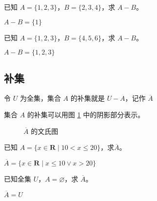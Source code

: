 \documentclass[lang=cn, chinesefont=founder, color=cyan, citestyle=gb7714-2015, bibstyle=gb7714-2015]{elegantbook}
\newcommand{\spare}{\vspace{-1em}\begin{center}\color{structurecolor}\hdashrule[0.5ex]{\textwidth}{1pt}{1pt}\end{center}\vspace{-1em}}
\renewcommand{\bar}[1]{\overline{#1}}
\begin{document}
\begin{collections}
    \begin{example}
        已知 $A = \{ 1, 2, 3 \}$，$B = \{2, 3, 4\}$，求 $A - B$。
    \end{example}
    \begin{solution}
        $A-B = \{1\}$
    \end{solution}

    \spare

    \begin{example}
        已知 $A = \{1, 2, 3\}$，$B = \{4, 5, 6\}$，求 $A - B$。
    \end{example}
    \begin{solution}
        $A - B = \{1, 2, 3\}$
    \end{solution}
\end{collections}

\subsection{补集}
\begin{definition}[集合的补集]
    令 $U$ 为全集，集合 $A$ 的补集就是 $U-A$，记作 $\bar{A}$
\end{definition}

集合 $A$ 的补集可以用图 \ref{fig:补集文氏图} 中的阴影部分表示。
\begin{figure}[htbp!]
    \centering
    \caption{$\bar{A}$ 的文氏图}
    \label{fig:补集文氏图}
\end{figure}

\begin{collections}
    \begin{example}
        已知 $A = \{x \in \symbf{R} \mid 10 < x \leq 20\}$，求$\bar{A}$。
    \end{example}
    \begin{solution}
        $\bar{A} = \{x \in \symbf{R} \mid x \leq 10 \lor x > 20\}$
    \end{solution}

    \spare

    \begin{example}
        已知全集 $U$，$A = \varnothing$，求 $\bar{A}$。
    \end{example}
    \begin{solution}
        $\bar{A} = U$
    \end{solution}
\end{collections}
\end{document}
